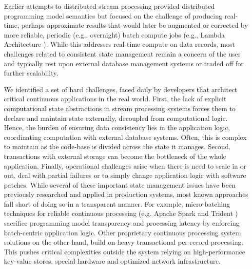 Earlier attempts to distributed stream processing \cite{CUSTOM:web/Storm} provided distributed programming model semantics but focused on the challenge of producing real-time, perhaps approximate results that would later be augmented or corrected by more reliable, periodic (e.g., overnight) batch compute jobs (e.g., Lambda Architecture \cite{marz2015big}). While this addresses real-time compute on data records, most challenges related to consistent state management remain a concern of the user and typically rest upon external database management systems or traded off for further scalability.


We identified a set of hard challenges, faced daily by developers that architect critical continuous applications in the real world. First, the lack of explicit computational state abstractions in stream processing systems forces them to declare and maintain state externally, decoupled from computational logic. Hence, the burden of ensuring data consistency lies in the application logic, coordinating computation with external database systems. Often, this is complex to maintain as the code-base is divided across the state it manages. Second, transactions with external storage can become the bottleneck of the whole application. Finally, operational challenges arise when there is need to scale in or out, deal with partial failures or to simply change application logic with software patches. While several of these important state management issues have been previously researched and applied in production systems, most known approaches fall short of doing so in a transparent manner. For example, micro-batching techniques for reliable continuous processing (e.g. Apache Spark and Trident \cite{zaharia2012discretized,CUSTOM:web/trident}) sacrifice programming model transparency and processing latency by enforcing batch-centric application logic. Other proprietary continuous processing system solutions \cite{millwheel} on the other hand, build on heavy transactional per-record processing. This pushes critical complexities outside the system relying on high-performance key-value stores, special hardware and optimized network infrastructure. 

